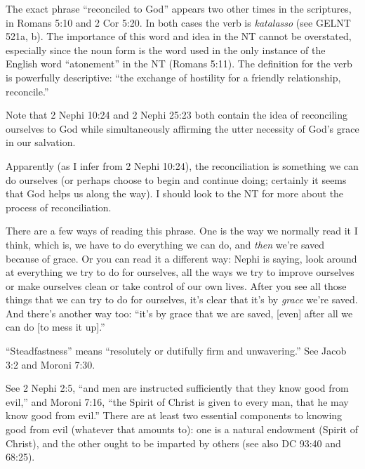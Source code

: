 \begin{compactdesc}
		\item[23$\vert$]
		\begin{compactdesc}
		
		\item[we labor diligently to write...] The exact phrase ``reconciled to God'' appears two other times in the scriptures, in Romans 5:10 and 2 Cor 5:20. In both cases the verb is \textit{katalasso} (see GELNT 521a, b). The importance of this word and idea in the NT cannot be overstated, especially since the noun form is the word used in the only instance of the English word ``atonement'' in the NT (Romans 5:11). The definition for the verb is powerfully descriptive: ``the exchange of hostility for a friendly relationship, reconcile.''

		Note that 2 Nephi 10:24 and 2 Nephi 25:23 both contain the idea of reconciling ourselves to God while simultaneously affirming the utter necessity of God's grace in our salvation.

		Apparently (as I infer from 2 Nephi 10:24), the reconciliation is something we can do ourselves (or perhaps choose to begin and continue doing; certainly it seems that God helps us along the way). I should look to the NT for more about the process of reconciliation.
		
		\item[after all we can do] There are a few ways of reading this phrase. One is the way we normally read it I think, which is, we have to do everything we can do, and \textit{then} we're saved because of grace. Or you can read it a different way: Nephi is saying, look around at everything we try to do for ourselves, all the ways we try to improve ourselves or make ourselves clean or take control of our own lives. After you see all those things that we can try to do for ourselves, it's clear that it's by \textit{grace} we're saved. And there's another way too: ``it's by grace that we are saved, [even] after all we can do [to mess it up].''
		
		\end{compactdesc}

		\item[24$\vert$]
		\begin{compactdesc}
		\item[with steadfastness] ``Steadfastness'' means ``resolutely or dutifully firm and unwavering.'' See Jacob 3:2 and Moroni 7:30.
		\end{compactdesc}

		\item[28$\vert$]
		\begin{compactdesc}
		\item[the words...are sufficient to teach...] See 2 Nephi 2:5, ``and men are instructed sufficiently that they know good from evil,'' and Moroni 7:16, ``the Spirit of Christ is given to every man, that he may know good from evil.'' There are at least two essential components to knowing good from evil (whatever that amounts to): one is a natural endowment (Spirit of Christ), and the other ought to be imparted by others (see also DC 93:40 and 68:25).
		\end{compactdesc}


\end{compactdesc}
